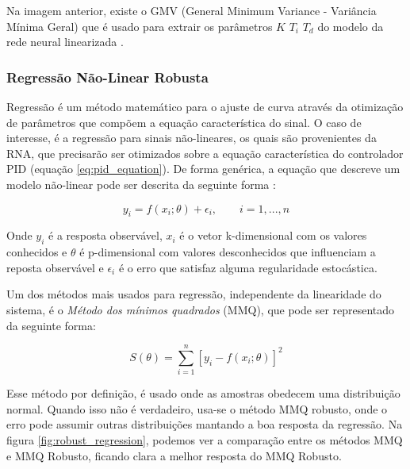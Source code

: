 Na imagem anterior, existe o GMV (General Minimum Variance - Variância Mínima Geral) que é usado para extrair os parâmetros $K$ $T_i$ $T_d$ do modelo da rede neural linearizada .



\subsubsection{Regressão Não-Linear Robusta}

Regressão é um método matemático para o ajuste de curva através da otimização de parâmetros que compõem a equação característica do sinal. O caso de interesse, é a regressão para sinais não-lineares, os quais são provenientes da RNA, que precisarão ser otimizados sobre a equação característica do controlador PID (equação \ref{eq:pid_equation}). De forma genérica, a equação que descreve um modelo não-linear pode ser descrita da seguinte forma \cite{robust2019}:

\begin{equation}
 y_i = f(x_i; \theta) + \epsilon_i, \quad\quad i = 1,...,n
\end{equation}

Onde $y_i$ é a resposta observável, $x_i$ é o vetor k-dimensional com os valores conhecidos e $\theta$ é p-dimensional com valores desconhecidos que influenciam a reposta observável e $\epsilon_i$ é o erro que satisfaz alguma regularidade estocástica. 

Um dos métodos mais usados para regressão, independente da linearidade do sistema, é o \textit{Método dos mínimos quadrados} (MMQ), que pode ser representado da seguinte forma:

\begin{equation}
 S(\theta) = \sum_{i=1}^{n}[y_i-f(x_i;\theta)]^2 
\end{equation}

Esse método por definição, é usado onde as amostras obedecem uma distribuição normal. Quando isso não é verdadeiro, usa-se o método MMQ robusto, onde o erro pode assumir outras distribuições mantando a boa resposta da regressão. Na figura \ref{fig:robust_regression}, podemos ver a comparação entre os métodos MMQ e MMQ Robusto, ficando clara a melhor resposta do MMQ Robusto.

